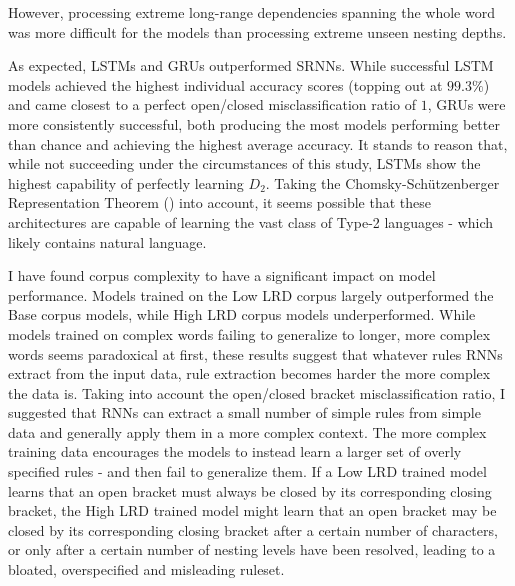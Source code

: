However, processing extreme long-range dependencies spanning the whole word was more difficult for the models than processing extreme unseen nesting depths. %

As expected, LSTMs and GRUs outperformed SRNNs. While successful LSTM models achieved the highest individual accuracy scores (topping out at $99.3\%$) and came closest to a perfect open/closed misclassification ratio of $1$, GRUs were more consistently successful, both producing the most models performing better than chance and achieving the highest average accuracy. It stands to reason that, while not succeeding under the circumstances of this study, LSTMs show the highest capability of perfectly learning $D_{2}$. Taking the Chomsky-Schützenberger Representation Theorem (\cite{Chomsky1963}) into account, it seems possible that these architectures are capable of learning the vast class of Type-2 languages - which likely contains natural language.

I have found corpus complexity to have a significant impact on model performance. Models trained on the Low LRD corpus largely outperformed the Base corpus models, while High LRD corpus models underperformed. While models trained on complex words failing to generalize to longer, more complex words seems paradoxical at first, these results suggest that whatever rules RNNs extract from the input data, rule extraction becomes harder the more complex the data is. Taking into account the open/closed bracket misclassification ratio, I suggested that RNNs can extract a small number of simple rules from simple data and generally apply them in a more complex context. The more complex training data encourages the models to instead learn a larger set of overly specified rules - and then fail to generalize them. If a Low LRD trained model learns that an open bracket must always be closed by its corresponding closing bracket, the High LRD trained model might learn that an open bracket may be closed by its corresponding closing bracket after a certain number of characters, or only after a certain number of nesting levels have been resolved, leading to a bloated, overspecified and misleading ruleset.

